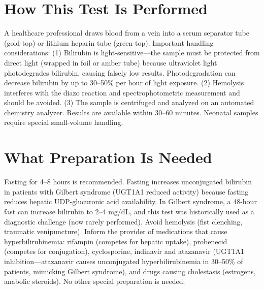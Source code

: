 \section*{How This Test Is Performed}
A healthcare professional draws blood from a vein into a serum separator tube (gold-top) or lithium heparin tube (green-top). Important handling considerations: (1) Bilirubin is light-sensitive---the sample must be protected from direct light (wrapped in foil or amber tube) because ultraviolet light photodegrades bilirubin, causing falsely low results. Photodegradation can decrease bilirubin by up to 30--50\% per hour of light exposure. (2) Hemolysis interferes with the diazo reaction and spectrophotometric measurement and should be avoided. (3) The sample is centrifuged and analyzed on an automated chemistry analyzer. Results are available within 30--60 minutes. Neonatal samples require special small-volume handling.

\section*{What Preparation Is Needed}
Fasting for 4--8 hours is recommended. Fasting increases unconjugated bilirubin in patients with Gilbert syndrome (UGT1A1 reduced activity) because fasting reduces hepatic UDP-glucuronic acid availability. In Gilbert syndrome, a 48-hour fast can increase bilirubin to 2--4 mg/dL, and this test was historically used as a diagnostic challenge (now rarely performed). Avoid hemolysis (fist clenching, traumatic venipuncture). Inform the provider of medications that cause hyperbilirubinemia: rifampin (competes for hepatic uptake), probenecid (competes for conjugation), cyclosporine, indinavir and atazanavir (UGT1A1 inhibition---atazanavir causes unconjugated hyperbilirubinemia in 30--50\% of patients, mimicking Gilbert syndrome), and drugs causing cholestasis (estrogens, anabolic steroids). No other special preparation is needed.

